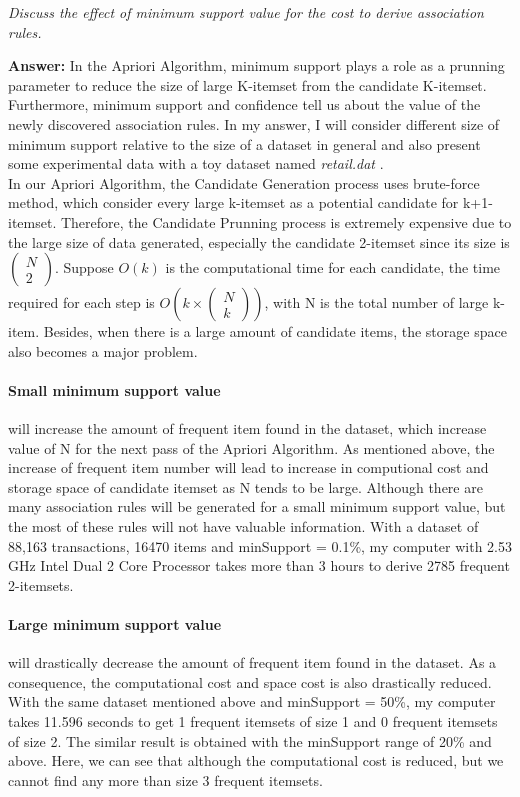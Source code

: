 \documentclass[a4paper,11pt]{article}
\begin{document}
\textit{Discuss the effect of minimum support value for the cost to derive association rules.} 

\noindent
\textbf{Answer:} In the Apriori Algorithm, minimum support plays a role as a prunning parameter to reduce the size of large K-itemset from the candidate K-itemset. Furthermore, minimum support and confidence tell us about the value of the newly discovered association rules. In my answer, I will consider different size of minimum support relative to the size of a dataset in general and also present some experimental data with a toy dataset named \emph{retail.dat}
\cite{retail}. \\[1em]
In our Apriori Algorithm, the Candidate Generation process uses brute-force method, which consider every large k-itemset as a potential candidate for k+1-itemset. Therefore, the Candidate Prunning process is extremely expensive due to the large size of data generated, especially the candidate 2-itemset since its size is $\begin{pmatrix} N\\2 \end{pmatrix}$. Suppose $O(k)$ is the computational time for each candidate, the time required for each step is $O(k\times
\begin{pmatrix} N\\k \end{pmatrix})$, with N is the total number of large k-item. Besides, when there is a large amount of candidate items, the storage space also becomes a major problem. 
\paragraph{Small minimum support value} will increase the amount of frequent item found in the dataset, which increase value of N for the next pass of the Apriori Algorithm. As mentioned above, the increase of frequent item number will lead to increase in computional cost and storage space of candidate itemset as N tends to be large. Although there are many association rules will be generated for a small minimum support value, but the most of these rules will not have valuable
information. With a dataset of 88,163 transactions, 16470 items \cite{retail} and minSupport = 0.1\%, my computer with 2.53 GHz Intel Dual 2 Core Processor takes more than 3 hours to derive 2785 frequent 2-itemsets.

\paragraph{Large minimum support value} will drastically decrease the amount of frequent item found in the dataset. As a consequence, the computational cost and space cost is also drastically reduced. With the same dataset mentioned above and minSupport = 50\%, my computer takes 11.596 seconds to get 1 frequent itemsets of size 1 and 0 frequent itemsets of size 2. The similar result is obtained with the minSupport range of 20\% and above. Here, we can see that although the computational cost is reduced, but we cannot find any more than size 3 frequent itemsets.
\end{document}
